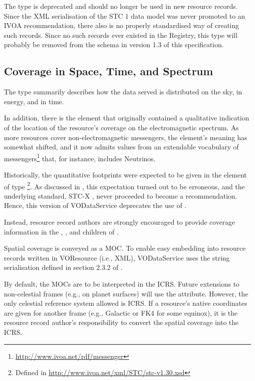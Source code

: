 \documentclass[11pt,a4paper]{ivoa}
\begin{document}
The  type is deprecated and should no longer be
used in new resource records.  Since the XML serialisation of the STC 1
data model was never promoted to an IVOA recommendation, there also is
no properly standardised way of creating such records.  Since no such
records ever existed in the Registry, this type will probably be removed
from the schema in version 1.3 of this specification.



\subsection{Coverage in Space, Time, and Spectrum}
\label{sect:cover}

The  type summarily describes how the data served is
distributed on the
sky, in energy, and in time.

In addition, there is the  element that originally
contained a qualitative indication of the location of the resource's
coverage on the electromagnetic spectrum.  As more resources cover
non-electromagnetic messengers, the element's meaning has somewhat
shifted, and it now admits values from an extendable vocabulary of
messengers\footnote{\url{http://www.ivoa.net/rdf/messenger}} that, for
instance, includes Neutrinos.

Historically, the quantitative footprints were expected to be given in
the element of type \footnote{Defined in
\url{http://www.ivoa.net/xml/STC/stc-v1.30.xsd}}.  As discussed in
\citet{note:regstc}, this expectation turned out to be erroneous,
and the underlying standard, STC-X \citep{note:stcx}, never proceeded to become
a recommendation.  Hence, this version of VODataService deprecates the
use of .

Instead, resource record authors are strongly encouraged to provide
coverage information in the , , and
 children of .

Spatial coverage is conveyed as a MOC.  To enable easy embedding into
resource records written in VOResource (i.e., XML),
VODataService uses the string serialisation defined in section 2.3.2 of
\citet{2019ivoa.spec.1007F}.

By default, the MOCs are to be interpreted in the ICRS.  Future
extensions to non-celestial frames (e.g., on planet
surfaces) will use the  attribute.
However, the only celestial reference system allowed is
ICRS.  If a resource's native coordinates are given for another frame (e.g.,
Galactic or FK4 for some equinox), it is the resource record author's
responsibility to convert the spatial coverage into the ICRS.
\end{document}
